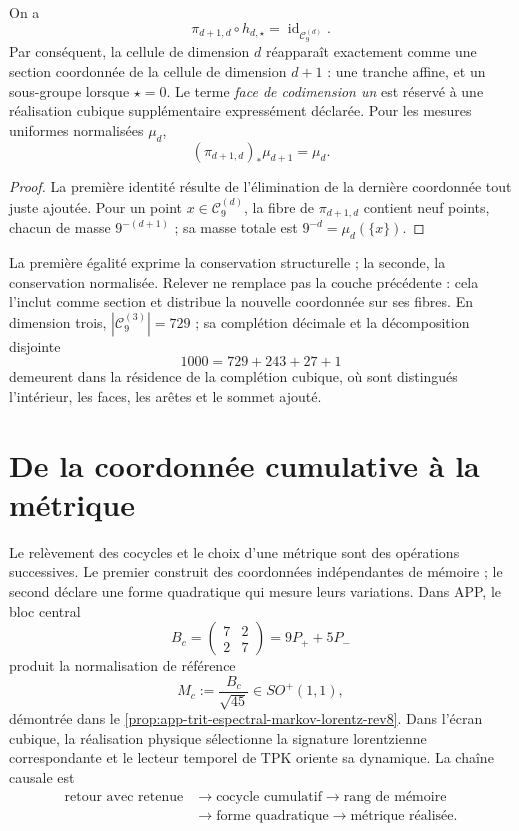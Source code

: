 \begin{proposition}
\label{prop:conservacion-elevacion-dimensional-rev2}
On a
\[
 \pi_{d+1,d}\circ h_{d,\star}=\operatorname{id}_{\mathcal C_9^{(d)}}.
\]
Par conséquent, la cellule de dimension \(d\) réapparaît exactement comme une
section coordonnée de la cellule de dimension \(d+1\) : une tranche affine, et un
sous-groupe lorsque \(\star=0\). Le terme \emph{face de codimension un} est
réservé à une réalisation cubique supplémentaire expressément déclarée. Pour les mesures
uniformes normalisées \(\mu_d\),
\[
 (\pi_{d+1,d})_*\mu_{d+1}=\mu_d.
\]
\end{proposition}

\begin{proof}
La première identité résulte de l'élimination de la dernière coordonnée tout juste
ajoutée. Pour un point \(x\in\mathcal C_9^{(d)}\), la fibre de
\(\pi_{d+1,d}\) contient neuf points, chacun de masse
\(9^{-(d+1)}\) ; sa masse totale est \(9^{-d}=\mu_d(\{x\})\).
\end{proof}

La première égalité exprime la conservation structurelle ; la seconde, la
conservation normalisée. Relever ne remplace pas la couche précédente : cela l'inclut
comme section et distribue la nouvelle coordonnée sur ses fibres. En dimension
trois, \(|\mathcal C_9^{(3)}|=729\) ; sa complétion décimale et la
décomposition disjointe
\[
 1000=729+243+27+1
\]
demeurent dans la résidence de la complétion cubique, où sont distingués
l'intérieur, les faces, les arêtes et le sommet ajouté.

\section{De la coordonnée cumulative à la métrique}

Le relèvement des cocycles et le choix d'une métrique sont des opérations
successives. Le premier construit des coordonnées indépendantes de mémoire ; le
second déclare une forme quadratique qui mesure leurs variations. Dans APP, le
bloc central
\[
 B_c=\begin{pmatrix}7&2\\2&7\end{pmatrix}=9P_++5P_-
\]
produit la normalisation de référence
\[
 M_c:=\frac{B_c}{\sqrt{45}}\in SO^+(1,1),
\]
démontrée dans le \cref{prop:app-trit-espectral-markov-lorentz-rev8}.
Dans l'écran cubique, la réalisation physique sélectionne la
signature lorentzienne correspondante et le lecteur temporel de TPK oriente sa
dynamique. La chaîne causale est
\[
 \begin{aligned}
 \text{retour avec retenue}
 &\longrightarrow\text{cocycle cumulatif}
 \longrightarrow\text{rang de mémoire}\\
 &\longrightarrow\text{forme quadratique}
 \longrightarrow\text{métrique réalisée}.
 \end{aligned}
\]

